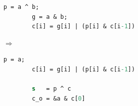 \begin{minipage}{.38\linewidth}
	\begin{lstlisting}[style=StyleCode, language=SystemVerilog, linewidth=.9\linewidth]
		p = a ^ b;
		g = a & b;
		c[i] = g[i] | (p[i] & c[i-1])
	\end{lstlisting}
\end{minipage}
\begin{minipage}{.1\linewidth}
	\hspace{0.5cm}
	$\Rightarrow$
\end{minipage}
\begin{minipage}{.38\linewidth}
	\begin{lstlisting}[style=StyleCode, language=SystemVerilog, linewidth=.9\linewidth]
		p = a;
		c[i] = g[i] | (p[i] & c[i-1])
		
		s 	= p ^ c
		c_o	= &a & c[0]
	\end{lstlisting}
\end{minipage}
